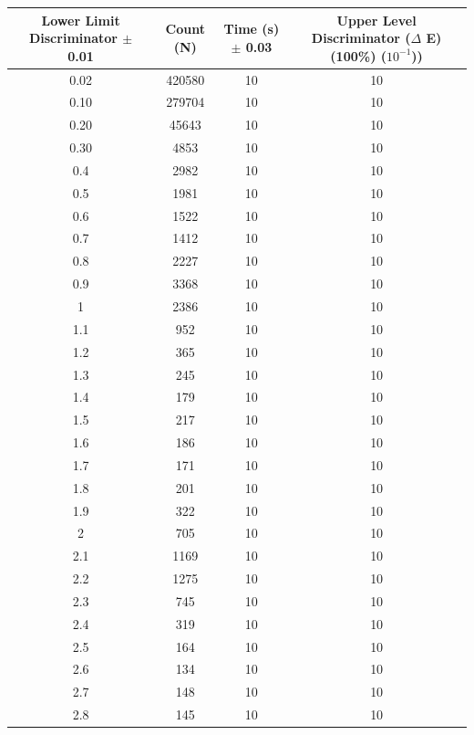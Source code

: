 \documentclass[a4paper]{report}
\numberwithin{equation}{section}
\begin{document}
\begin{table}[!ht]
    \centering
	\begin{tabular}{|c|c|c|c|}
    \hline
	Lower Limit Discriminator $\pm$ 0.01 & Count (N) & Time (s) $\pm$ 0.03 & Upper Level Discriminator ($\Delta$ E) (100\%) ($10^{-1}$)) \\ \hline
        0.02 & 420580 & 10 & 10 \\ \hline
        0.10 & 279704 & 10 & 10 \\ \hline
        0.20 & 45643 & 10 & 10 \\ \hline
        0.30 & 4853 & 10 & 10 \\ \hline
        0.4 & 2982 & 10 & 10 \\ \hline
        0.5 & 1981 & 10 & 10 \\ \hline
        0.6 & 1522 & 10 & 10 \\ \hline
        0.7 & 1412 & 10 & 10 \\ \hline
        0.8 & 2227 & 10 & 10 \\ \hline
        0.9 & 3368 & 10 & 10 \\ \hline
        1 & 2386 & 10 & 10 \\ \hline
        1.1 & 952 & 10 & 10 \\ \hline
        1.2 & 365 & 10 & 10 \\ \hline
        1.3 & 245 & 10 & 10 \\ \hline
        1.4 & 179 & 10 & 10 \\ \hline
        1.5 & 217 & 10 & 10 \\ \hline
        1.6 & 186 & 10 & 10 \\ \hline
        1.7 & 171 & 10 & 10 \\ \hline
        1.8 & 201 & 10 & 10 \\ \hline
        1.9 & 322 & 10 & 10 \\ \hline
        2 & 705 & 10 & 10 \\ \hline
        2.1 & 1169 & 10 & 10 \\ \hline
        2.2 & 1275 & 10 & 10 \\ \hline
        2.3 & 745 & 10 & 10 \\ \hline
        2.4 & 319 & 10 & 10 \\ \hline
        2.5 & 164 & 10 & 10 \\ \hline
        2.6 & 134 & 10 & 10 \\ \hline
        2.7 & 148 & 10 & 10 \\ \hline
        2.8 & 145 & 10 & 10 \\ \hline

\end{tabular}
\end{table}
\end{document}
